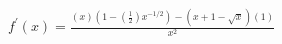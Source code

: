 $ \displaystyle f^{\prime}(x) = \frac{(x)(1 - \left(\frac{1}{2}\right)x^{-1/2}) - (x + 1 - \sqrt{x})(1)}{x^2} $